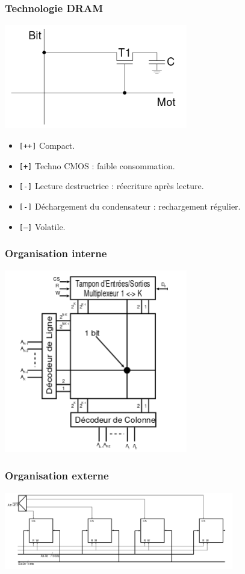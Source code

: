 \documentclass[10pt]{article}
\begin{document}
\begin{multicols}{2}
  \subsubsection{Technologie DRAM}
  \includegraphics[width=8cm]{./dram_cell.png}
  \begin{itemize}
    \itemsep0em
    \item \texttt{[++]} Compact.
    \item \texttt{[+]} Techno CMOS : faible consommation.
    \item \texttt{[-]} Lecture destructrice : réecriture après lecture.
    \item \texttt{[-]} Déchargement du condensateur : rechargement régulier.
    \item \texttt{[--]} Volatile.
  \end{itemize}
  \subsubsection{Organisation interne}
  \includegraphics[width=8cm]{./internal_org.png}
  \subsubsection{Organisation externe}
  \includegraphics[width=10cm]{./external_org.png}
  \newpage

\end{multicols}
\end{document}
